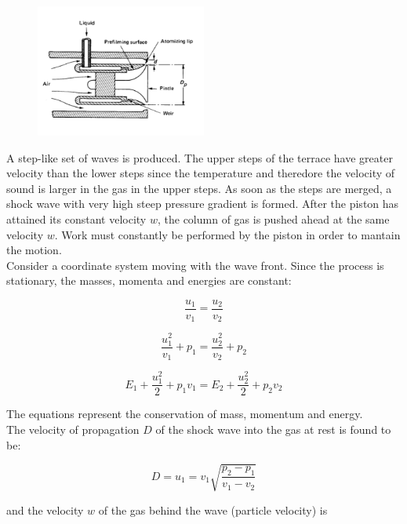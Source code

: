 \documentclass[12pt]{article}
\begin{document}
\begin{figure}[!ht]
\centering
\includegraphics[width=0.5\textwidth]{figures/airblast.png}
\end{figure}

A step-like set of waves is produced. The upper steps of the terrace have greater velocity than the lower steps since the temperature and theredore the velocity of sound is larger in the gas in the upper steps. As soon as the steps are merged, a shock wave with very high steep pressure gradient is formed. After the piston has attained its constant velocity $w$, the column of gas is pushed ahead at the same velocity $w$. Work must constantly be performed by the piston in order to mantain the motion.\\
Consider a coordinate system moving with the wave front. Since the process is stationary, the masses, momenta and energies are constant:

\begin{equation}
    \frac{u_{1}}{v_{1}} =  \frac{u_{2}}{v_{2}}
\end{equation}

\begin{equation}
    \frac{u_{1}^{2}}{v_{1}} + p_{1} =  \frac{u_{2}^{2}}{v_{2}} + p_{2}
\end{equation}

\begin{equation}
    E_{1} + \frac{u_{1}^{2}}{2} + p_{1}v_{1} = E_{2} + \frac{u_{2}^{2}}{2} + p_{2}v_{2}
\end{equation}

The equations represent the conservation of mass, momentum and energy.\\
The velocity of propagation $D$ of the shock wave into the gas at rest is found to be:

\begin{equation}
    D = u_{1} = v_{1}\sqrt{\frac{p_{2}-p_{1}}{v_{1}-v_{2}}}
\end{equation}

and the velocity $w$ of the gas behind the wave (particle velocity) is
\end{document}
